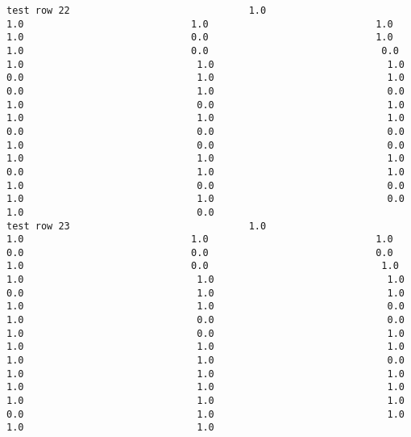 \documentclass[11pt]{article}
\begin{document}
\begin{verbatim}
test row 22                               1.0                             1.0                             1.0                             1.0                             1.0                             0.0                             1.0                             1.0                             0.0                              0.0                              1.0                              1.0                              1.0                              0.0                              1.0                              1.0                              0.0                              1.0                              0.0                              1.0                              0.0                              1.0                              1.0                              1.0                              1.0                              0.0                              0.0                              0.0                              1.0                              0.0                              0.0                              1.0                              1.0                              1.0                              0.0                              1.0                              1.0                              1.0                              0.0                              0.0                              1.0                              1.0                              0.0                              1.0                              0.0
test row 23                               1.0                             1.0                             1.0                             1.0                             0.0                             0.0                             0.0                             1.0                             0.0                              1.0                              1.0                              1.0                              1.0                              0.0                              1.0                              1.0                              1.0                              1.0                              0.0                              1.0                              0.0                              0.0                              1.0                              0.0                              1.0                              1.0                              1.0                              1.0                              1.0                              1.0                              0.0                              1.0                              1.0                              1.0                              1.0                              1.0                              1.0                              1.0                              1.0                              1.0                              0.0                              1.0                              1.0                              1.0                              1.0

\end{verbatim}
\end{document}
